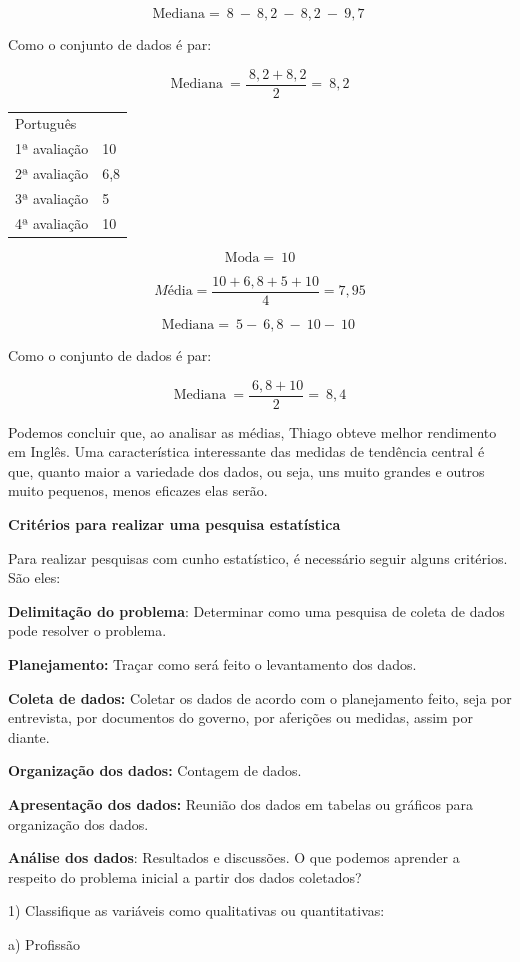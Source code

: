 \[\text{Mediana} = \ 8\  - \ 8,2\  - \ 8,2\  - \ 9,7\ \]

Como o conjunto de dados é par:

\[\text{Mediana}\  = \frac{\ 8,2 + 8,2}{2} = \ 8,2\]

\begin{longtable}[]{@{}ll@{}}
\toprule
\endhead
Português~ &\tabularnewline
1ª avaliação & 10\tabularnewline
2ª avaliação & 6,8\tabularnewline
3ª avaliação & 5\tabularnewline
4ª avaliação & 10\tabularnewline
\bottomrule
\end{longtable}

\[\text{Moda} = \ 10\]

\[Mé\text{dia} = \frac{10 + 6,8 + 5 + 10}{4} = 7,95\]

\[\text{Mediana} = \ 5 - \ 6,8\  - \ 10 - \ 10\ \]

Como o conjunto de dados é par:

\[\text{Mediana}\  = \frac{\ 6,8 + 10}{2} = \ 8,4\]

Podemos concluir que, ao analisar as médias, Thiago obteve melhor
rendimento em Inglês. Uma característica interessante das medidas de
tendência central é que, quanto maior a variedade dos dados, ou seja,
uns muito grandes e outros muito pequenos, menos eficazes elas serão.

\textbf{Critérios para realizar uma pesquisa estatística~}

Para realizar pesquisas com cunho estatístico, é necessário seguir
alguns critérios. São eles:

\textbf{Delimitação do problema}: Determinar como uma pesquisa de coleta
de dados pode resolver o problema.

\textbf{Planejamento:} Traçar como será feito o levantamento dos dados.

\textbf{Coleta de dados:} Coletar os dados de acordo com o planejamento
feito, seja por entrevista, por documentos do governo, por aferições ou
medidas, assim por diante.

\textbf{Organização dos dados:} Contagem de dados.

\textbf{Apresentação dos dados:} Reunião dos dados em tabelas ou
gráficos para organização dos dados.

\textbf{Análise dos dados}: Resultados e discussões. O que podemos
aprender a respeito do problema inicial a partir dos dados coletados?

1) Classifique as variáveis como qualitativas ou quantitativas:

a) Profissão

